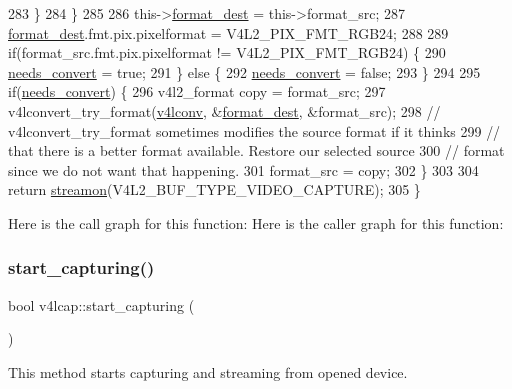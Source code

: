 \begin{DoxyCode}
283         \}
284     \}
285 
286     this->\hyperlink{classv4lcap_a51d51cae7bdc2fe6aa5bec4ddbeb6c31}{format\_dest} = this->format\_src;
287     \hyperlink{classv4lcap_a51d51cae7bdc2fe6aa5bec4ddbeb6c31}{format\_dest}.fmt.pix.pixelformat = V4L2\_PIX\_FMT\_RGB24;
288 
289     \textcolor{keywordflow}{if}(format\_src.fmt.pix.pixelformat != V4L2\_PIX\_FMT\_RGB24) \{
290         \hyperlink{classv4lcap_acd02d2da6ff03a44a2e155af449144e4}{needs\_convert} = \textcolor{keyword}{true};
291     \} \textcolor{keywordflow}{else} \{
292         \hyperlink{classv4lcap_acd02d2da6ff03a44a2e155af449144e4}{needs\_convert} = \textcolor{keyword}{false};
293     \}
294 
295     \textcolor{keywordflow}{if}(\hyperlink{classv4lcap_acd02d2da6ff03a44a2e155af449144e4}{needs\_convert}) \{
296         v4l2\_format copy = format\_src;
297         v4lconvert\_try\_format(\hyperlink{classv4lcap_a5e57bbf84383d7b42d0cc9d1e7e03abb}{v4lconv}, &\hyperlink{classv4lcap_a51d51cae7bdc2fe6aa5bec4ddbeb6c31}{format\_dest}, &format\_src);
298         \textcolor{comment}{// v4lconvert\_try\_format sometimes modifies the source format if it thinks}
299         \textcolor{comment}{// that there is a better format available. Restore our selected source}
300         \textcolor{comment}{// format since we do not want that happening.}
301         format\_src = copy;
302     \}
303 
304     \textcolor{keywordflow}{return} \hyperlink{classv4lcap_abb1f77b86c0368cd40dab1fb8d4a2565}{streamon}(V4L2\_BUF\_TYPE\_VIDEO\_CAPTURE);
305 \}
\end{DoxyCode}
Here is the call graph for this function\+:
Here is the caller graph for this function\+:
\mbox{\label{classv4lcap_aa8b3b1ffead9a21abf2aea074d1b309b}} 
\subsubsection{\texorpdfstring{start\+\_\+capturing()}{start\_capturing()}\hspace{0.1cm}{\footnotesize\ttfamily [2/2]}}
{\footnotesize\ttfamily bool v4lcap\+::start\+\_\+capturing (\begin{DoxyParamCaption}{ }\end{DoxyParamCaption})}



This method starts capturing and streaming from opened device. 

